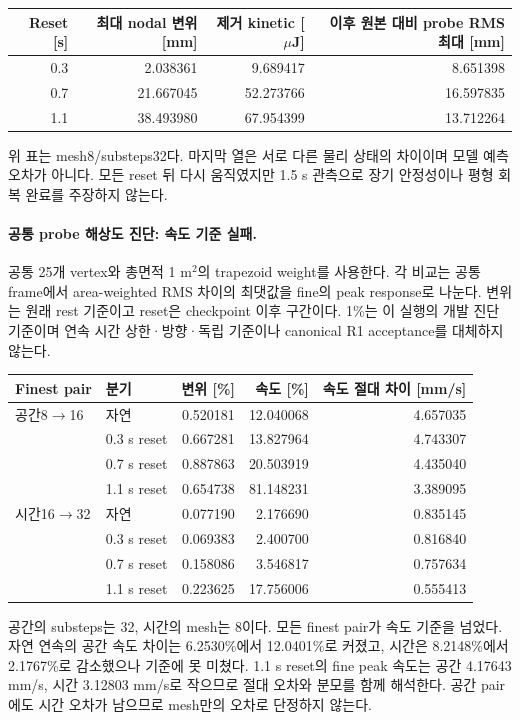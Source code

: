 \documentclass[10pt]{article}
\begin{document}
\begin{longtable}{rrrr}
\toprule Reset [s] & 최대 nodal 변위 [mm] & 제거 kinetic [$\mu$J] & 이후 원본 대비 probe RMS 최대 [mm]\\\midrule
0.3 & 2.038361 & 9.689417 & 8.651398\\
0.7 & 21.667045 & 52.273766 & 16.597835\\
1.1 & 38.493980 & 67.954399 & 13.712264\\
\bottomrule\end{longtable}
위 표는 mesh8/substeps32다. 마지막 열은 서로 다른 물리 상태의 차이이며 모델 예측 오차가 아니다.
모든 reset 뒤 다시 움직였지만 1.5 s 관측으로 장기 안정성이나 평형 회복 완료를 주장하지 않는다.

\paragraph{공통 probe 해상도 진단: 속도 기준 실패.}
공통 25개 vertex와 총면적 1 m$^2$의 trapezoid weight를 사용한다.
각 비교는 공통 frame에서 area-weighted RMS 차이의 최댓값을 fine의 peak response로 나눈다.
변위는 원래 rest 기준이고 reset은 checkpoint 이후 구간이다. 1\%는 이 실행의 개발 진단 기준이며
연속 시간 상한·방향·독립 기준이나 canonical R1 acceptance를 대체하지 않는다.
\begin{longtable}{llrrr}
\toprule Finest pair & 분기 & 변위 [\%] & 속도 [\%] & 속도 절대 차이 [mm/s]\\\midrule
공간8$\to$16 & 자연 & 0.520181 & 12.040068 & 4.657035\\
 & 0.3 s reset & 0.667281 & 13.827964 & 4.743307\\
 & 0.7 s reset & 0.887863 & 20.503919 & 4.435040\\
 & 1.1 s reset & 0.654738 & 81.148231 & 3.389095\\
시간16$\to$32 & 자연 & 0.077190 & 2.176690 & 0.835145\\
 & 0.3 s reset & 0.069383 & 2.400700 & 0.816840\\
 & 0.7 s reset & 0.158086 & 3.546817 & 0.757634\\
 & 1.1 s reset & 0.223625 & 17.756006 & 0.555413\\
\bottomrule\end{longtable}
공간의 substeps는 32, 시간의 mesh는 8이다. 모든 finest pair가 속도 기준을 넘었다.
자연 연속의 공간 속도 차이는 6.2530\%에서 12.0401\%로 커졌고,
시간은 8.2148\%에서 2.1767\%로 감소했으나 기준에 못 미쳤다.
1.1 s reset의 fine peak 속도는 공간 4.17643 mm/s, 시간 3.12803 mm/s로 작으므로
절대 오차와 분모를 함께 해석한다. 공간 pair에도 시간 오차가 남으므로 mesh만의 오차로 단정하지 않는다.
\end{document}
